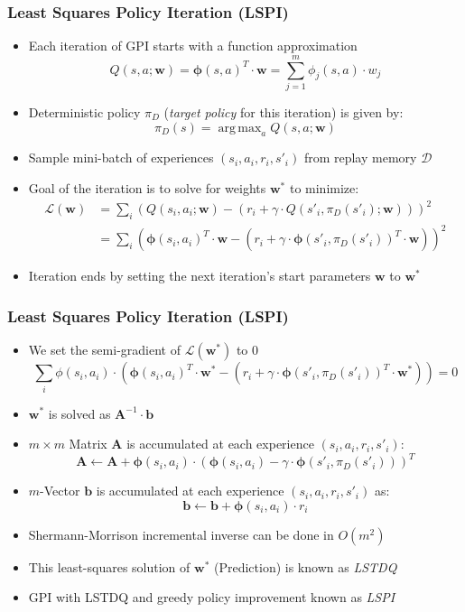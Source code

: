 \documentclass{beamer}
\DeclareMathOperator*{\argmax}{arg\,max}
\begin{document}
\begin{frame}
\frametitle{Least Squares Policy Iteration (LSPI)}
\pause
\begin{itemize}[<+->]
\item Each iteration of GPI starts with a function approximation
$$Q(s,a; \bm{w}) = \bm{\phi}(s,a)^T \cdot \bm{w} = \sum_{j=1}^m \phi_j(s,a) \cdot w_j$$
\item Deterministic policy $\pi_D$ ({\em target policy} for this iteration) is given by:
$$\pi_D(s) = \argmax_a Q(s,a; \bm{w})$$
\item Sample mini-batch of experiences $(s_i,a_i,r_i,s'_i)$ from replay memory $\mathcal{D}$
\item Goal of the iteration is to solve for weights $\bm{w}^*$ to minimize:
\begin{align*}
\mathcal{L}(\bm{w}) & = \sum_i (Q(s_i,a_i; \bm{w}) - (r_i + \gamma \cdot Q(s'_i,\pi_D(s'_i); \bm{w})))^2\\
& = \sum_i (\bm{\phi}(s_i,a_i)^T \cdot \bm{w} - (r_i + \gamma \cdot \bm{\phi}(s'_i, \pi_D(s'_i))^T \cdot \bm{w}))^2
\end{align*}
\item Iteration ends by setting the next iteration's start parameters $\bm{w}$ to $\bm{w}^*$
\end{itemize}
\end{frame}

\begin{frame}
\frametitle{Least Squares Policy Iteration (LSPI)}
\pause
\begin{itemize}[<+->]
\item We set the semi-gradient of $\mathcal{L}(\bm{w}^*)$ to 0
\begin{equation}
\sum_i \phi(s_i,a_i) \cdot (\bm{\phi}(s_i,a_i)^T \cdot \bm{w}^* - (r_i + \gamma \cdot \bm{\phi}(s'_i, \pi_D(s'_i))^T \cdot \bm{w}^*)) = 0
\label{eq:lspi-loss-semi-gradient}
\end{equation}
\item $\bm{w}^*$ is solved as $\bm{A}^{-1} \cdot \bm{b}$
\item $m \times m$ Matrix $\bm{A}$ is accumulated at each experience $(s_i,a_i,r_i,s'_i)$:
$$ \bm{A} \leftarrow \bm{A} + \bm{\phi}(s_i, a_i) \cdot (\bm{\phi}(s_i, a_i) - \gamma \cdot \bm{\phi}(s'_i, \pi_D(s'_i)))^T $$
\item $m$-Vector $\bm{b}$ is accumulated at each experience $(s_i,a_i,r_i,s'_i)$ as:
$$\bm{b} \leftarrow \bm{b} + \bm{\phi}(s_i, a_i) \cdot r_i$$
\item Shermann-Morrison incremental inverse can be done in $O(m^2)$
\item This least-squares solution of $\bm{w}^*$ (Prediction) is known as {\em LSTDQ}
\item GPI with LSTDQ and greedy policy improvement known as {\em LSPI}
\end{itemize}
\end{frame}
\end{document}
